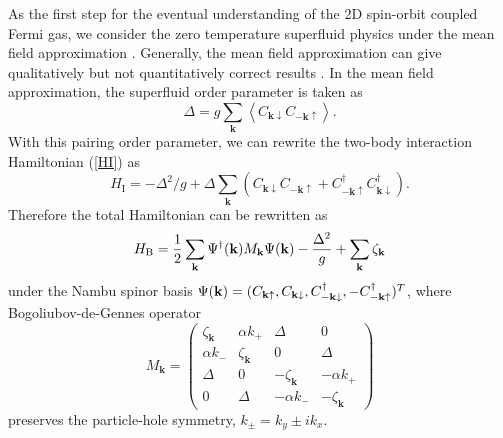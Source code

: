 \documentclass[pra,print,showpacs,superscriptaddress,twocolumn]{revtex4}
\begin{document}
As the first step for the eventual understanding of the 2D
spin-orbit coupled Fermi gas, we consider the zero temperature
superfluid physics under the mean field approximation \cite{MR}.
Generally, the mean field approximation can give qualitatively but
not quantitatively correct results \cite{Bertaina}. In the mean
field approximation, the superfluid order parameter is taken as
\begin{equation}
\Delta =g\sum_{\mathbf{k}}\left\langle C_{\mathbf{k}\downarrow }C_{-\mathbf{k%
}\uparrow }\right\rangle .  \label{order}
\end{equation}%
With this pairing order parameter, we can rewrite the two-body interaction
Hamiltonian (\ref{HI}) as
\begin{equation}
H_{\text{I}}=-\Delta ^{2}/g+\Delta \sum_{\mathbf{k}}(C_{\mathbf{k}\downarrow
}C_{-\mathbf{k}\uparrow }+C_{-\mathbf{k}\uparrow }^{\dagger }C_{\mathbf{k}%
\downarrow }^{\dagger }).  \label{interactionH}
\end{equation}%
Therefore the total Hamiltonian can be rewritten as
\begin{equation}
H_{\text{B}}=\frac{1}{2}\sum_{\mathbf{k}}\Psi ^{\dagger }(\mathbf{k})M_{%
\mathbf{k}}\Psi (\mathbf{k})-\frac{\Delta ^{2}}{g}+\sum_{\mathbf{k}}\zeta _{%
\mathbf{k}}  \label{BDG}
\end{equation}%
under the Nambu spinor basis $\Psi (\mathbf{k})=(C_{\mathbf{k}\uparrow },C_{%
\mathbf{k}\downarrow },C_{-\mathbf{k\downarrow }}^{\dagger },-C_{-\mathbf{k}%
\uparrow }^{\dagger })^{T}$, where Bogoliubov-de-Gennes operator
\begin{equation}
M_{\mathbf{k}}=\left(
\begin{array}{cccc}
\zeta _{\mathbf{k}} & \alpha k_{+} & \Delta  & 0 \\
\alpha k_{-} & \zeta _{\mathbf{k}} & 0 & \Delta  \\
\Delta  & 0 & -\zeta _{\mathbf{k}} & -\alpha k_{+} \\
0 & \Delta  & -\alpha k_{-} & -\zeta _{\mathbf{k}}%
\end{array}%
\right)   \label{MAT}
\end{equation}%
preserves the particle-hole symmetry, $k_{\pm }=k_{y}\pm ik_{x}$.
\end{document}
